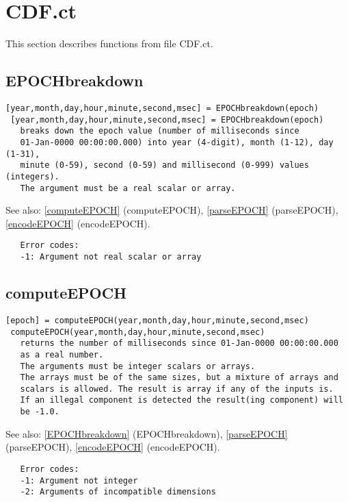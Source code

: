 \documentclass[a4paper]{article}
\begin{document}
\section{CDF.ct}

This section describes functions from file CDF.ct.




\subsection{EPOCHbreakdown\label{EPOCHbreakdown}}

\begin{tscreen}
\begin{verbatim}
[year,month,day,hour,minute,second,msec] = EPOCHbreakdown(epoch)
 [year,month,day,hour,minute,second,msec] = EPOCHbreakdown(epoch)
   breaks down the epoch value (number of milliseconds since
   01-Jan-0000 00:00:00.000) into year (4-digit), month (1-12), day (1-31),
   minute (0-59), second (0-59) and millisecond (0-999) values (integers).
   The argument must be a real scalar or array.
\end{verbatim}

See also: \ref{computeEPOCH} {(computeEPOCH)}, \ref{parseEPOCH} {(parseEPOCH)}, \ref{encodeEPOCH} {(encodeEPOCH)}.
\begin{verbatim}
   Error codes:
   -1: Argument not real scalar or array
\end{verbatim}
\end{tscreen}



\subsection{computeEPOCH\label{computeEPOCH}}

\begin{tscreen}
\begin{verbatim}
[epoch] = computeEPOCH(year,month,day,hour,minute,second,msec)
 computeEPOCH(year,month,day,hour,minute,second,msec)
   returns the number of milliseconds since 01-Jan-0000 00:00:00.000
   as a real number.
   The arguments must be integer scalars or arrays.
   The arrays must be of the same sizes, but a mixture of arrays and
   scalars is allowed. The result is array if any of the inputs is.
   If an illegal component is detected the result(ing component) will
   be -1.0.
\end{verbatim}

See also: \ref{EPOCHbreakdown} {(EPOCHbreakdown)}, \ref{parseEPOCH} {(parseEPOCH)}, \ref{encodeEPOCH} {(encodeEPOCH)}.
\begin{verbatim}
   Error codes:
   -1: Argument not integer
   -2: Arguments of incompatible dimensions
\end{verbatim}
\end{tscreen}
\end{document}
